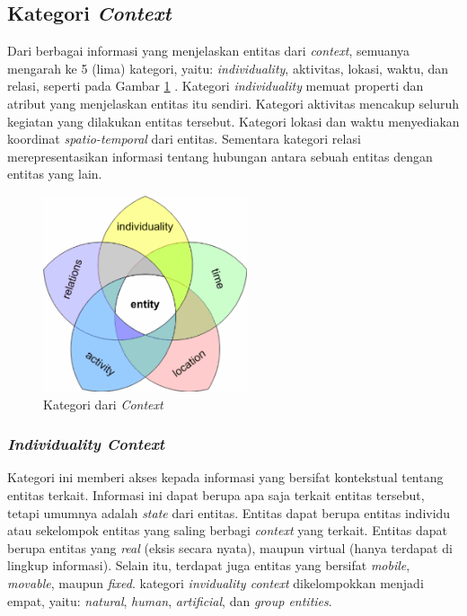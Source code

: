 \subsection{Kategori \textit{Context}}
\label{ssec:context-category}
Dari berbagai informasi yang menjelaskan entitas dari \textit{context}, semuanya mengarah ke 5 (lima) kategori, yaitu: \textit{individuality}, aktivitas, lokasi, waktu, dan relasi, seperti pada Gambar \ref{fig:context-categories} \citep{zimmermann_operational_2007}. Kategori \textit{individuality} memuat properti dan atribut yang menjelaskan entitas itu sendiri. Kategori aktivitas mencakup seluruh kegiatan yang dilakukan entitas tersebut. Kategori lokasi dan waktu menyediakan koordinat \textit{spatio-temporal} dari entitas. Sementara kategori relasi merepresentasikan informasi tentang hubungan antara sebuah entitas dengan entitas yang lain.


\begin{figure}[!]
	\centering
	\includegraphics[width=6cm]{Resources/Images/context-categories}
	\caption{Kategori dari \textit{Context}}
	\label{fig:context-categories}
\end{figure}


\subsubsection{\textit{Individuality Context}}
\label{sssec:individuality-context}
Kategori ini memberi akses kepada informasi yang bersifat kontekstual tentang entitas terkait. Informasi ini dapat berupa apa saja terkait entitas tersebut, tetapi umumnya adalah \textit{state} dari entitas. Entitas dapat berupa entitas individu atau sekelompok entitas yang saling berbagi \textit{context} yang terkait. Entitas dapat berupa entitas yang \textit{real} (eksis secara nyata), maupun virtual (hanya terdapat di lingkup informasi). Selain itu, terdapat juga entitas yang bersifat \textit{mobile}, \textit{movable}, maupun \textit{fixed}. kategori \textit{inviduality context} dikelompokkan menjadi empat, yaitu: \textit{natural}, \textit{human}, \textit{artificial}, dan \textit{group entities}.


